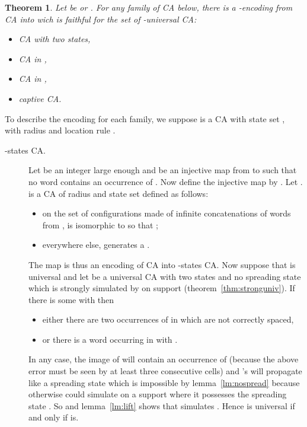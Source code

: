 \documentclass[a4paper]{elsarticle}
\newtheorem{thm}{Theorem}[section]
\begin{document}
\begin{thm}
  \label{thm:encodings}
  Let  be  or .  For any family of CA
  below, there is a -encoding from CA into  wich is
  faithful for the set  of -universal CA:
  \begin{itemize}
  \item CA with two states,
  \item CA in ,
  \item CA in , 
  \item captive CA.
  \end{itemize}
\end{thm}
\begin{pf}
  To describe the encoding for each family, we suppose  is a CA
  with state set , with radius  and
  location rule .
  \begin{description}
  \item[-states CA.] Let  be an integer large enough and 
    be an injective map from  to  such that no
    word  contains an occurrence of . Now define the
    injective map  by
    . Let .  is a
    CA of radius  and state set  defined as follows:
    \begin{itemize}
    \item on the set  of configurations made of infinite
      concatenations of words from ,  is
      isomorphic to  so that ;
    \item everywhere else,  generates a .
    \end{itemize}
    The map  is thus an encoding of CA into -states CA. Now
    suppose that  is universal and let  be a
    universal CA with two states and no spreading state which is
    strongly simulated by  on support 
    (theorem~\ref{thm:stronguniv}). If there is some  with
     then
    \begin{itemize}
    \item either there are two occurrences of  in  which are
      not correctly spaced,
    \item or there is a word  occurring in  with
      .
    \end{itemize}
    In any case, the image of  will contain an occurrence of 
    (because the above error must be seen by at least three consecutive
    cells) and 's will propagate like a spreading state which is
    impossible by lemma~\ref{lm:nospread} because otherwise
     could simulate  on a support
    where it possesses the spreading state . So 
    and lemma~\ref{lm:lift} shows that  simulates . Hence
     is universal if and only if  is.


\end{description}
\end{pf}
\end{document}
